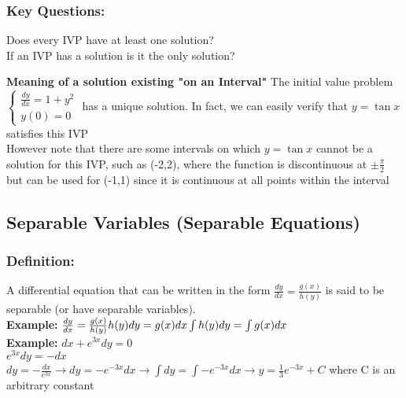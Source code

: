 \documentclass{article}
\begin{document}
\subsubsection{\textbf{Key Questions:}}Does every IVP have at least one solution?\\ If an IVP has a solution is it the only solution?

\textbf{Meaning of a solution existing "on an Interval"}
The initial value problem
\\$\begin{cases}
    \frac{dy}{dx} =1+y^2
    \\ y(0)=0
\end{cases}$ has a unique solution. In fact, we can easily verify that $y=\tan x$ satisfies this IVP
\\ However note that there are some intervals on which $y=\tan x$ cannot be a solution for this IVP, such as (-2,2),
where the function is discontinuous at $\pm \frac{\pi}{2}$ but can be used for (-1,1) since it is continuous at all points within the interval
\subsection{Separable Variables (Separable Equations)}
\subsubsection{\textbf{Definition: }}A differential equation that can be written in the form $\frac{dy}{dx}= \frac{g(x)}{h(y)}$ is said to be separable (or have separable variables).
\\\textbf{Example: } $\frac{dy}{dx}= \frac{g(x)}{h(y)} \\[0.05in]h(y) dy = g(x) dx \\[0.05in] \int{h(y)}{dy} = \int g(x) dx$ 
\\\textbf{Example: } $dx+e^{3x}dy=0$ \\ $e^{3x} dy = -dx$ \\ $dy=-\frac{dx}{e^{3x}}\rightarrow dy=-{e^{-3x}}{dx} \rightarrow \int dy=\int -{e^{-3x}}{dx} \rightarrow y=\frac{1}{3}e^{-3x}+C$ where C is an arbitrary constant
\end{document}
